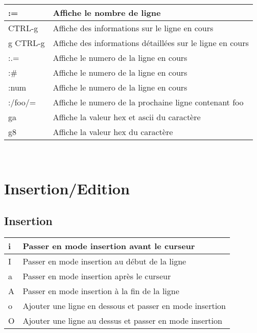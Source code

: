 \documentclass{article}
\begin{document}
\begin{tabular}{|p{3cm}| l| }
\hline
:= & Affiche le nombre de ligne\\ \hline
CTRL-g & Affiche des informations sur le ligne en cours\\ \hline
g CTRL-g & Affiche des informations détaillées sur le ligne en cours\\ \hline
:.= & Affiche le numero de la ligne en cours\\ \hline
:\# & Affiche le numero de la ligne en cours\\ \hline
:num & Affiche le numero de la ligne en cours\\ \hline
:/foo/= & Affiche le numero de la prochaine ligne contenant foo\\ \hline
ga & Affiche la valeur hex et ascii du caractère\\ \hline
g8 & Affiche la valeur hex du caractère\\ \hline
\end{tabular}\\

\section{Insertion/Edition}
\subsection{Insertion}
\begin{tabular}{|p{3cm}| l| }
\hline
i & Passer en mode insertion avant le curseur\\ \hline
I & Passer en mode insertion au début de la ligne\\ \hline
a & Passer en mode insertion après le curseur\\ \hline
A & Passer en mode insertion à la fin de la ligne\\ \hline
o & Ajouter une ligne en dessous et passer en mode insertion \\ \hline
O & Ajouter une ligne au dessus et passer en mode insertion \\ \hline
\end{tabular}\\
\end{document}
